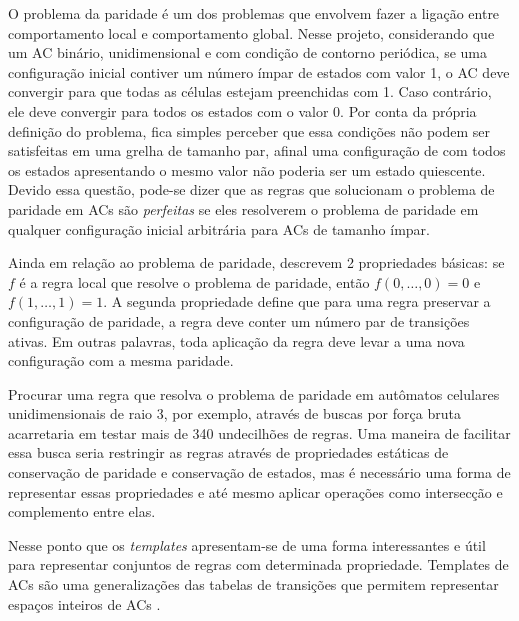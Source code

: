 \documentclass[12pt,a4paper]{article}
\begin{document}
O problema da paridade é um dos problemas que envolvem fazer a ligação entre comportamento local e comportamento global. Nesse projeto, considerando que um AC binário, unidimensional e com condição de contorno periódica, se uma configuração inicial contiver um número ímpar de estados com valor 1, o AC deve convergir para que todas as células estejam preenchidas com 1. Caso contrário, ele deve convergir para todos os estados com o valor 0. Por conta da própria definição do problema, fica simples perceber que essa condições não podem ser satisfeitas em uma grelha de tamanho par, afinal uma configuração de com todos os estados apresentando o mesmo valor não poderia ser um estado quiescente. Devido essa questão, pode-se dizer que as regras que solucionam o problema de paridade em ACs são \textit{perfeitas} se eles resolverem o problema de paridade em qualquer configuração inicial arbitrária para ACs de tamanho ímpar. 

Ainda em relação ao problema de paridade,  descrevem 2 propriedades básicas: se $f$ é a regra local que resolve o problema de paridade, então $f(0, \dots, 0) = 0$ e $f(1, \dots, 1) = 1$. A segunda propriedade define que para uma regra preservar a configuração de paridade, a regra deve conter um número par de transições ativas. Em outras palavras, toda aplicação da regra deve levar a uma nova configuração com a mesma paridade.

Procurar uma regra que resolva o problema de paridade em autômatos celulares unidimensionais de raio 3, por exemplo, através de buscas por força bruta acarretaria em testar mais de 340 undecilhões de regras. Uma maneira de facilitar essa busca seria restringir as regras através de propriedades estáticas de conservação de paridade e conservação de estados, mas é necessário uma forma de representar essas propriedades e até mesmo aplicar operações como intersecção e complemento entre elas.

Nesse ponto que os \textit{templates} apresentam-se de uma forma interessantes e útil para representar conjuntos de regras com determinada propriedade. Templates de ACs são uma generalizações das tabelas de transições que permitem representar espaços inteiros de ACs \cite{daCosta2014}.
\end{document}
